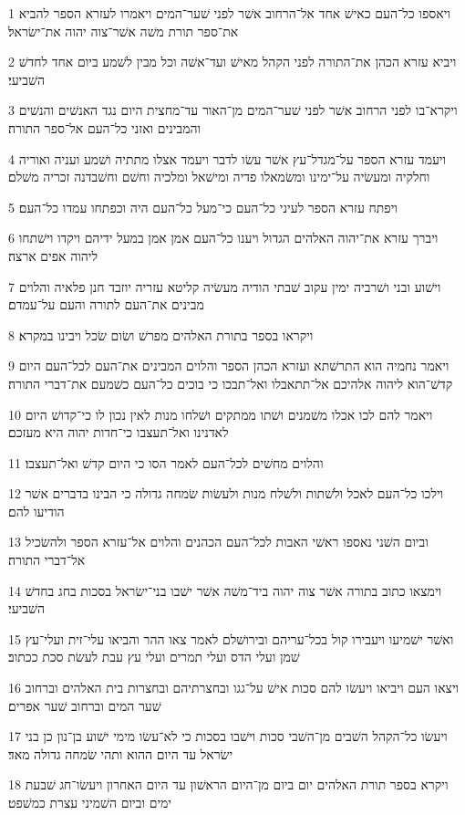 \par 1 ויאספו כל־העם כאישׁ אחד אל־הרחוב אשׁר לפני שׁער־המים ויאמרו לעזרא הספר להביא את־ספר תורת משׁה אשׁר־צוה יהוה את־ישׂראל׃
\par 2 ויביא עזרא הכהן את־התורה לפני הקהל מאישׁ ועד־אשׁה וכל מבין לשׁמע ביום אחד לחדשׁ השׁביעי׃
\par 3 ויקרא־בו לפני הרחוב אשׁר לפני שׁער־המים מן־האור עד־מחצית היום נגד האנשׁים והנשׁים והמבינים ואזני כל־העם אל־ספר התורה׃
\par 4 ויעמד עזרא הספר על־מגדל־עץ אשׁר עשׂו לדבר ויעמד אצלו מתתיה ושׁמע ועניה ואוריה וחלקיה ומעשׂיה על־ימינו ומשׂמאלו פדיה ומישׁאל ומלכיה וחשׁם וחשׁבדנה זכריה משׁלם׃
\par 5 ויפתח עזרא הספר לעיני כל־העם כי־מעל כל־העם היה וכפתחו עמדו כל־העם׃
\par 6 ויברך עזרא את־יהוה האלהים הגדול ויענו כל־העם אמן אמן במעל ידיהם ויקדו וישׁתחו ליהוה אפים ארצה׃
\par 7 וישׁוע ובני ושׁרביה ימין עקוב שׁבתי הודיה מעשׂיה קליטא עזריה יוזבד חנן פלאיה והלוים מבינים את־העם לתורה והעם על־עמדם׃
\par 8 ויקראו בספר בתורת האלהים מפרשׁ ושׂום שׂכל ויבינו במקרא׃
\par 9 ויאמר נחמיה הוא התרשׁתא ועזרא הכהן הספר והלוים המבינים את־העם לכל־העם היום קדשׁ־הוא ליהוה אלהיכם אל־תתאבלו ואל־תבכו כי בוכים כל־העם כשׁמעם את־דברי התורה׃
\par 10 ויאמר להם לכו אכלו משׁמנים ושׁתו ממתקים ושׁלחו מנות לאין נכון לו כי־קדושׁ היום לאדנינו ואל־תעצבו כי־חדות יהוה היא מעזכם׃
\par 11 והלוים מחשׁים לכל־העם לאמר הסו כי היום קדשׁ ואל־תעצבו׃
\par 12 וילכו כל־העם לאכל ולשׁתות ולשׁלח מנות ולעשׂות שׂמחה גדולה כי הבינו בדברים אשׁר הודיעו להם׃
\par 13 וביום השׁני נאספו ראשׁי האבות לכל־העם הכהנים והלוים אל־עזרא הספר ולהשׂכיל אל־דברי התורה׃
\par 14 וימצאו כתוב בתורה אשׁר צוה יהוה ביד־משׁה אשׁר ישׁבו בני־ישׂראל בסכות בחג בחדשׁ השׁביעי׃
\par 15 ואשׁר ישׁמיעו ויעבירו קול בכל־עריהם ובירושׁלם לאמר צאו ההר והביאו עלי־זית ועלי־עץ שׁמן ועלי הדס ועלי תמרים ועלי עץ עבת לעשׂת סכת ככתוב׃
\par 16 ויצאו העם ויביאו ויעשׂו להם סכות אישׁ על־גגו ובחצרתיהם ובחצרות בית האלהים וברחוב שׁער המים וברחוב שׁער אפרים׃
\par 17 ויעשׂו כל־הקהל השׁבים מן־השׁבי סכות וישׁבו בסכות כי לא־עשׂו מימי ישׁוע בן־נון כן בני ישׂראל עד היום ההוא ותהי שׂמחה גדולה מאד׃
\par 18 ויקרא בספר תורת האלהים יום ביום מן־היום הראשׁון עד היום האחרון ויעשׂו־חג שׁבעת ימים וביום השׁמיני עצרת כמשׁפט׃

